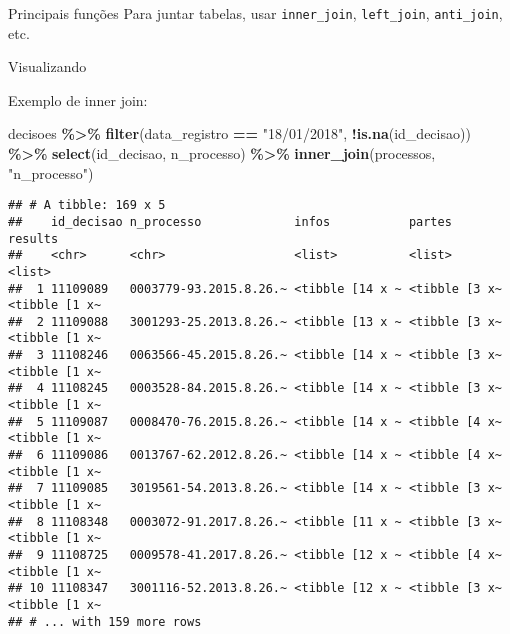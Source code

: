 \documentclass[
  10pt,
  ignorenonframetext,
]{beamer}
\newenvironment{Shaded}{\begin{snugshade}}{\end{snugshade}}
\newcommand{\KeywordTok}[1]{\textcolor[rgb]{0.13,0.29,0.53}{\textbf{#1}}}
\newcommand{\NormalTok}[1]{#1}
\newcommand{\OperatorTok}[1]{\textcolor[rgb]{0.81,0.36,0.00}{\textbf{#1}}}
\newcommand{\StringTok}[1]{\textcolor[rgb]{0.31,0.60,0.02}{#1}}
\begin{document}
\begin{frame}[fragile]{Principais funções}
\protect\hypertarget{principais-funuxe7uxf5es}{}
Para juntar tabelas, usar \texttt{inner\_join}, \texttt{left\_join},
\texttt{anti\_join}, etc.
\end{frame}

\begin{frame}{Visualizando}
\protect\hypertarget{visualizando}{}
\end{frame}

\begin{frame}[fragile]{Exemplo de inner join:}
\protect\hypertarget{exemplo-de-inner-join}{}
\begin{Shaded}
\begin{Highlighting}[]
\NormalTok{decisoes }\OperatorTok{\%\textgreater{}\%}\StringTok{ }
\StringTok{  }\KeywordTok{filter}\NormalTok{(data\_registro }\OperatorTok{==}\StringTok{ "18/01/2018"}\NormalTok{, }\OperatorTok{!}\KeywordTok{is.na}\NormalTok{(id\_decisao)) }\OperatorTok{\%\textgreater{}\%}\StringTok{ }
\StringTok{  }\KeywordTok{select}\NormalTok{(id\_decisao, n\_processo) }\OperatorTok{\%\textgreater{}\%}\StringTok{ }
\StringTok{  }\KeywordTok{inner\_join}\NormalTok{(processos, }\StringTok{"n\_processo"}\NormalTok{)}
\end{Highlighting}
\end{Shaded}
\end{frame}

\begin{frame}[fragile]{}
\protect\hypertarget{section-8}{}
\begin{verbatim}
## # A tibble: 169 x 5
##    id_decisao n_processo             infos           partes        results      
##    <chr>      <chr>                  <list>          <list>        <list>       
##  1 11109089   0003779-93.2015.8.26.~ <tibble [14 x ~ <tibble [3 x~ <tibble [1 x~
##  2 11109088   3001293-25.2013.8.26.~ <tibble [13 x ~ <tibble [3 x~ <tibble [1 x~
##  3 11108246   0063566-45.2015.8.26.~ <tibble [14 x ~ <tibble [3 x~ <tibble [1 x~
##  4 11108245   0003528-84.2015.8.26.~ <tibble [14 x ~ <tibble [3 x~ <tibble [1 x~
##  5 11109087   0008470-76.2015.8.26.~ <tibble [14 x ~ <tibble [4 x~ <tibble [1 x~
##  6 11109086   0013767-62.2012.8.26.~ <tibble [14 x ~ <tibble [4 x~ <tibble [1 x~
##  7 11109085   3019561-54.2013.8.26.~ <tibble [14 x ~ <tibble [3 x~ <tibble [1 x~
##  8 11108348   0003072-91.2017.8.26.~ <tibble [11 x ~ <tibble [3 x~ <tibble [1 x~
##  9 11108725   0009578-41.2017.8.26.~ <tibble [12 x ~ <tibble [4 x~ <tibble [1 x~
## 10 11108347   3001116-52.2013.8.26.~ <tibble [12 x ~ <tibble [3 x~ <tibble [1 x~
## # ... with 159 more rows
\end{verbatim}
\end{frame}
\end{document}
